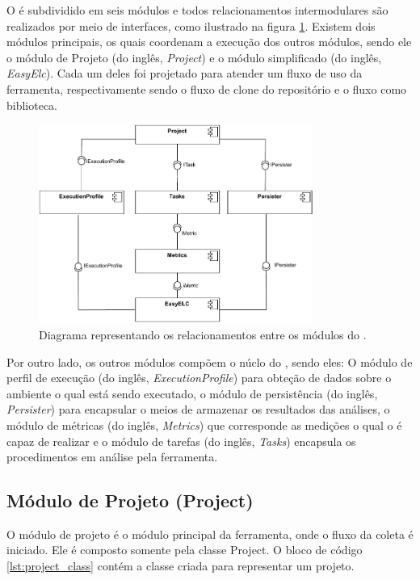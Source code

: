 \documentclass[12pt]{tcc}
\begin{document}
	O  é subdividido em seis módulos e todos relacionamentos intermodulares são realizados por meio de interfaces, como ilustrado na figura \ref{fig:diagrama-arquitetura}.
	Existem dois módulos principais, os quais coordenam a execução dos outros módulos, sendo ele o módulo de Projeto (do inglês, \emph{Project}) e o módulo  simplificado (do inglês, \emph{EasyElc}).
	Cada um deles foi projetado para atender um fluxo de uso da ferramenta, respectivamente sendo o fluxo de clone do repositório e o fluxo como biblioteca.

	\begin{figure}[!ht]
		\centering
		\includegraphics[width=0.8\textwidth]{figures/diagramaarquiteturaelchupacabra.pdf}
		\caption{Diagrama representando os relacionamentos entre os módulos do .}
		\label{fig:diagrama-arquitetura}
	\end{figure}
	
	Por outro lado, os outros módulos compõem o núclo do , sendo eles: O módulo de perfil de execução (do inglês, \emph{ExecutionProfile}) para obteção de dados sobre o ambiente o qual está sendo executado, o módulo de persistência (do inglês, \emph{Persister}) para encapsular o meios de armazenar os resultados das análises, o módulo de métricas (do inglês, \emph{Metrics}) que corresponde as medições o qual o  é capaz de realizar e o módulo de tarefas (do inglês, \emph{Tasks}) encapsula os procedimentos em análise pela ferramenta.


	\subsection{Módulo de Projeto (Project)}
	\label{subsection:modulo-project}

	O módulo de projeto é o módulo principal da ferramenta, onde o fluxo da coleta é iniciado. Ele é composto somente pela classe Project. O bloco de código \ref{lst:project_class} contém a classe criada para representar um projeto.
\end{document}
